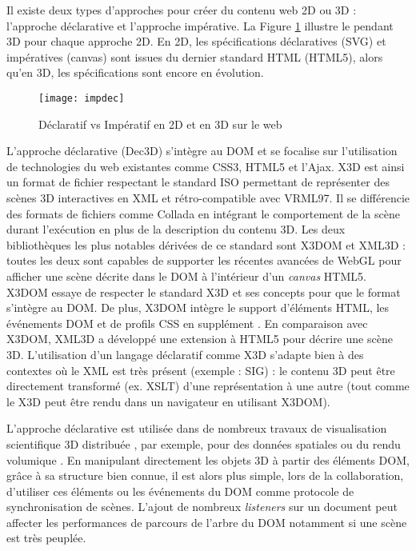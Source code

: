 Il existe deux types d'approches pour créer du contenu web 2D ou 
3D : l'approche déclarative et l'approche impérative. La Figure \ref{fig:impdec} 
illustre le pendant \gls{3D} pour chaque approche 2D. En 2D, les spécifications 
déclaratives (\gls{SVG}) et impératives (canvas) sont issues du dernier standard 
HTML (HTML5), alors qu'en \gls{3D}, les spécifications sont encore en évolution. 

\begin{figure}[hbt]
	\centering
	\texttt{[image: impdec]}
	\caption{Déclaratif vs Impératif en 2D et en \gls{3D} sur le web}
	\label{fig:impdec}
\end{figure}

L'approche déclarative (Dec3D) s'intègre au \gls{DOM} et se 
focalise sur l'utilisation de technologies du web existantes comme CSS3, 
HTML5 et l'Ajax. 
X3D est ainsi un format de fichier respectant le standard ISO \cite{X3D2011} permettant de 
représenter des scènes \gls{3D} interactives en XML et rétro-compatible avec 
VRML97. Il 
se différencie des formats de fichiers comme Collada en intégrant le comportement de 
la scène durant l'exécution en plus de la description du contenu \gls{3D}. Les deux 
bibliothèques les plus notables dérivées de ce standard sont X3DOM 
\cite{Behr2010} et XML3D \cite{Sons2010} : toutes les deux sont capables de 
supporter les récentes avancées de WebGL pour afficher une scène décrite dans 
le \gls{DOM} à l'intérieur d'un \textit{canvas} HTML5. 
X3DOM essaye de respecter le standard X3D et ses concepts pour que le format s'intègre au \gls{DOM}. De plus, X3DOM intègre le support 
d'éléments \gls{HTML}, les événements \gls{DOM} et de profils \acrshort{CSS} en 
supplément \cite{Sutter2015}. 
En comparaison avec X3DOM, XML3D a développé une extension à \gls{HTML}5 
pour décrire une scène \gls{3D}. 
L'utilisation d'un langage déclaratif comme X3D s'adapte bien à des contextes où 
le XML est très présent (exemple : \gls{SIG}) : le contenu \gls{3D} peut être 
directement transformé (ex. XSLT) d'une 
représentation à une autre (tout comme le X3D peut être rendu dans un navigateur 
en utilisant X3DOM). 

L'approche déclarative est utilisée dans de nombreux travaux de visualisation 
scientifique \gls{3D} distribuée \cite{Jung2012}, par exemple, pour des données 
spatiales 
\cite{Stein2014} ou du rendu volumique \cite{Becher2012}. 
En manipulant directement les objets \gls{3D} à partir des éléments \gls{DOM}, 
grâce à 
sa structure bien connue, il est alors plus simple, lors de la collaboration, d'utiliser 
ces éléments \cite{Gadea2016} ou les événements du \gls{DOM} \cite{Lowet2009} 
comme protocole de synchronisation de scènes. 
L'ajout de nombreux \textit{listeners} sur un document peut affecter les 
performances de parcours de l'arbre du \gls{DOM} notamment si une scène est
très peuplée.

